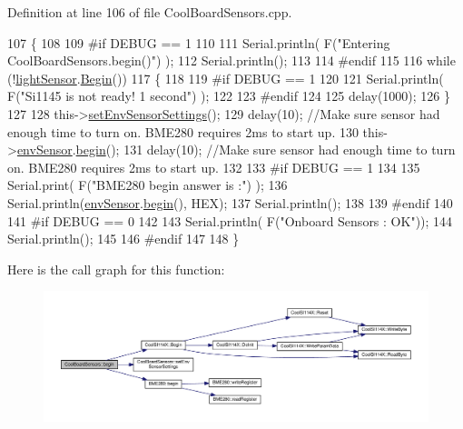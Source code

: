 Definition at line 106 of file Cool\+Board\+Sensors.\+cpp.


\begin{DoxyCode}
107 \{  
108 
109 \textcolor{preprocessor}{#if DEBUG == 1 }
110      
111     Serial.println( F(\textcolor{stringliteral}{"Entering CoolBoardSensors.begin()"}) );
112     Serial.println();
113 
114 \textcolor{preprocessor}{#endif}
115 
116     \textcolor{keywordflow}{while} (!\hyperlink{class_cool_board_sensors_ac711c27d0927eb5e73be77f092c48be0}{lightSensor}.\hyperlink{class_cool_s_i114_x_a206b36aca7049f63be1d11088c30a09f}{Begin}()) 
117     \{
118     
119 \textcolor{preprocessor}{    #if DEBUG == 1}
120 
121         Serial.println( F(\textcolor{stringliteral}{"Si1145 is not ready!  1 second"}) );
122 
123 \textcolor{preprocessor}{    #endif}
124 
125         delay(1000);
126     \}
127      
128     this->\hyperlink{class_cool_board_sensors_a406307ffd70272282d91479c7ed8d66f}{setEnvSensorSettings}();
129     delay(10);  \textcolor{comment}{//Make sure sensor had enough time to turn on. BME280 requires 2ms to start up.}
130     this->\hyperlink{class_cool_board_sensors_a868e38985e9a2412829fa2790ca13e2e}{envSensor}.\hyperlink{class_b_m_e280_a994c102f010547f9c740a338ef9905c7}{begin}();
131     delay(10);  \textcolor{comment}{//Make sure sensor had enough time to turn on. BME280 requires 2ms to start up.}
132 
133 \textcolor{preprocessor}{#if DEBUG == 1 }
134     
135     Serial.print( F(\textcolor{stringliteral}{"BME280 begin answer is :"}) );
136     Serial.println(\hyperlink{class_cool_board_sensors_a868e38985e9a2412829fa2790ca13e2e}{envSensor}.\hyperlink{class_b_m_e280_a994c102f010547f9c740a338ef9905c7}{begin}(), HEX);
137     Serial.println();
138 
139 \textcolor{preprocessor}{#endif}
140 
141 \textcolor{preprocessor}{#if DEBUG == 0}
142 
143     Serial.println( F(\textcolor{stringliteral}{"Onboard Sensors : OK"}));
144     Serial.println();
145 
146 \textcolor{preprocessor}{#endif}
147 
148 \}
\end{DoxyCode}
Here is the call graph for this function\+:\nopagebreak
\begin{figure}[H]
\begin{center}
\leavevmode
\includegraphics[width=350pt]{de/d46/class_cool_board_sensors_a97095823ef7c8f5290812f1405b966b3_cgraph}
\end{center}
\end{figure}
